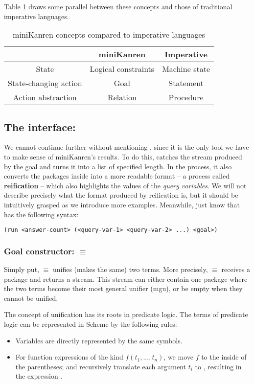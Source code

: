 Table \ref{tab1} draws some parallel between these concepts and those of traditional imperative languages.

\begin{table}
\caption{miniKanren concepts compared to imperative languages}
\label{tab1}
\begin{tabular}{ | c | c | c | }
\hline
 & miniKanren & Imperative \\ 
\hline
State & Logical constraints & Machine state \\  
State-changing action & Goal & Statement \\
Action abstraction & Relation & Procedure \\
\hline
\end{tabular}
\end{table}

\subsection{The interface: }
We cannot continue further without mentioning , since it is the only tool we have to make sense of miniKanren's results. To do this,  catches the stream produced by the goal and turns it into a list of specified length. In the process, it also converts the packages inside into a more readable format -- a process called \textbf{reification} -- which also highlights the values of the \textit{query variables}. We will not describe precisely what the format produced by reification is, but it should be intuitively grasped as we introduce more examples. Meanwhile, just know that  has the following syntax:
\begin{lstlisting}
(run <answer-count> (<query-var-1> <query-var-2> ...) <goal>)
\end{lstlisting}
\subsubsection{Goal constructor: $\equiv$}
Simply put, $\equiv$ unifies (makes the same) two terms. More precisely, $\equiv$ receives a package and returns a stream. This stream can either contain one package where the two terms become their most general unifier (mgu), or be empty when they cannot be unified.

The concept of unification has its roots in predicate logic. The terms of predicate logic can be represented in Scheme by the following rules:
\begin{itemize}
\item Variables are directly represented by the same symbols.
\item For function expressions of the kind $f(t_1,...,t_n)$, we move $f$ to the inside of the parentheses; and recursively translate each argument $t_i$ to , resulting in the expression .
\end{itemize}

